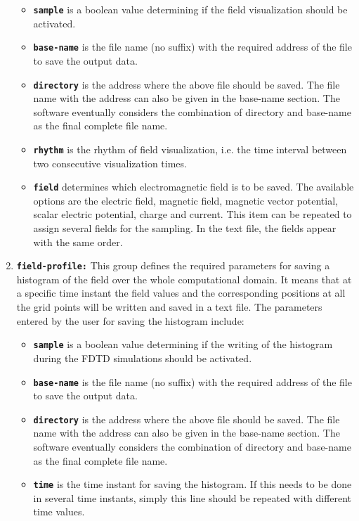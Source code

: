 \begin{enumerate}
\begin{itemize}
	\item \textbf{\texttt{sample}} is a boolean value determining if the field visualization should be activated.
	\item \textbf{\texttt{base-name}} is the file name (no suffix) with the required address of the file to save the output data.
	\item \textbf{\texttt{directory}} is the address where the above file should be saved. The file name with the address can also be given in the base-name section. The software eventually considers the combination of directory and base-name as the final complete file name.
	\item \textbf{\texttt{rhythm}} is the rhythm of field visualization, i.e. the time interval between two consecutive visualization times.
	\item \textbf{\texttt{field}} determines which electromagnetic field is to be saved. The available options are the electric field, magnetic field, magnetic vector potential, scalar electric potential, charge and current. This item can be repeated to assign several fields for the sampling. In the text file, the fields appear with the same order.
\end{itemize}
\item \textbf{\texttt{field-profile:}} This group defines the required parameters for saving a histogram of the field over the whole computational domain. It means that at a specific time instant the field values and the corresponding positions at all the grid points will be written and saved in a text file. The parameters entered by the user for saving the histogram include:
\begin{itemize}
	\item \textbf{\texttt{sample}} is a boolean value determining if the writing of the histogram during the FDTD simulations should be activated.
	\item \textbf{\texttt{base-name}} is the file name (no suffix) with the required address of the file to save the output data.
	\item \textbf{\texttt{directory}} is the address where the above file should be saved. The file name with the address can also be given in the base-name section. The software eventually considers the combination of directory and base-name as the final complete file name.
	\item \textbf{\texttt{time}} is the time instant for saving the histogram. If this needs to be done in several time instants, simply this line should be repeated with different time values.

\end{itemize}
\end{enumerate}
